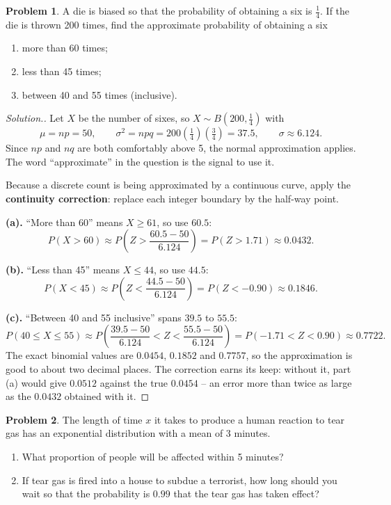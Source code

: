\documentclass[12pt,a4paper]{report}
\theoremstyle{definition}
\theoremstyle{plain}
\theoremstyle{definition}
\newtheorem{problemx}{Problem}[section]
\newenvironment{problem}{\begin{problemx}}{\end{problemx}}
\newenvironment{solution}
  {\renewcommand{\qedsymbol}{}\begin{proof}[\textit{Solution}.]}
  {\end{proof}}
\begin{document}
\begin{problem}
A die is biased so that the probability of obtaining a six is $\frac{1}{4}$. If the die is
thrown 200 times, find the approximate probability of obtaining a six
\begin{enumerate}
\item[(a).] more than 60 times;
\item[(b).] less than 45 times;
\item[(c).] between 40 and 55 times (inclusive).
\end{enumerate}
\end{problem}

\begin{solution}
Let $X$ be the number of sixes, so $X\sim B\left(200,\tfrac14\right)$ with
\[\mu = np = 50, \qquad \sigma^{2} = npq = 200\left(\tfrac14\right)\left(\tfrac34\right)
 = 37.5, \qquad \sigma \approx 6.124.\]
Since $np$ and $nq$ are both comfortably above 5, the normal approximation applies. The
word ``approximate'' in the question is the signal to use it.

Because a discrete count is being approximated by a continuous curve, apply the
\textbf{continuity correction}: replace each integer boundary by the half-way point.

\textbf{(a).} ``More than 60'' means $X\geq 61$, so use $60.5$:
\[P(X>60) \approx P\left(Z>\frac{60.5-50}{6.124}\right) = P(Z>1.71) \approx 0.0432.\]

\textbf{(b).} ``Less than 45'' means $X\leq 44$, so use $44.5$:
\[P(X<45) \approx P\left(Z<\frac{44.5-50}{6.124}\right) = P(Z<-0.90) \approx 0.1846.\]

\textbf{(c).} ``Between 40 and 55 inclusive'' spans $39.5$ to $55.5$:
\[P(40\leq X\leq 55) \approx P\left(\frac{39.5-50}{6.124}<Z<\frac{55.5-50}{6.124}\right)
 = P(-1.71<Z<0.90) \approx 0.7722.\]
The exact binomial values are $0.0454$, $0.1852$ and $0.7757$, so the approximation is
good to about two decimal places. The correction earns its keep: without it, part (a)
would give $0.0512$ against the true $0.0454$ -- an error more than twice as large as the
$0.0432$ obtained with it.
\end{solution}

\begin{problem}
The length of time $x$ it takes to produce a human reaction to tear gas has an exponential
distribution with a mean of 3 minutes.
\begin{enumerate}
\item[(a).] What proportion of people will be affected within 5 minutes?
\item[(b).] If tear gas is fired into a house to subdue a terrorist, how long should you
wait so that the probability is $0.99$ that the tear gas has taken effect?
\end{enumerate}
\end{problem}
\end{document}
